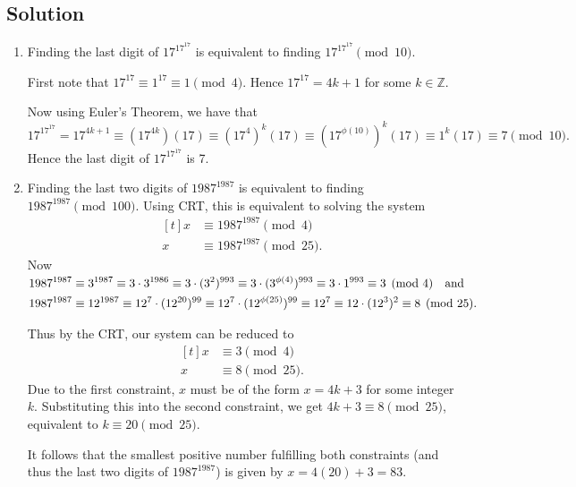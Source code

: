 \documentclass{article}
\begin{document}
\subsection*{Solution}
    \begin{enumerate}
        \item Finding the last digit of $17^{17^{17}}$ is equivalent to finding $17^{17^{17}} \pmod{10}$. 
            
        \vspace{1.5mm}
        First note that $17^{17} \equiv 1^{17} \equiv 1 \pmod 4$. Hence $17^{17} = 4k + 1$ for some $k \in \mathbb{Z}$. 
        
        Now using Euler's Theorem, we have that $$17^{17^{17}} = 17^{4k + 1} \equiv (17^{4k})(17) \equiv (17^{4})^{k}(17) \equiv (17^{\phi(10)})^{k}(17) \equiv 1^{k}(17) \equiv 7 \pmod{10}.$$ Hence the last digit of $17^{17^{17}}$ is 7.
        
        \item Finding the last two digits of $1987^{1987}$ is equivalent to finding $1987^{1987} \pmod{100}$. Using CRT, this is equivalent to solving the system 
        $$\begin{aligned}[t]
            x &\equiv 1987^{1987} \pmod{4} \\
            x &\equiv 1987^{1987} \pmod{25}.
        \end{aligned}$$
        Now 
        $\begin{aligned}[t]
            1987^{1987} &\equiv 3^{1987} \equiv 3 \cdot 3^{1986} \equiv 3 \cdot (3^{2})^{993} \equiv 3 \cdot (3^{\phi(4)})^{993} \equiv 3 \cdot 1^{993} \equiv 3 \pmod{4} \text{\quad and} \\
            1987^{1987} &\equiv 12^{1987} \equiv 12^{7} \cdot (12^{20})^{99} \equiv 12^{7} \cdot (12^{\phi(25)})^{99} \equiv 12^{7} \equiv 12 \cdot (12^{3})^{2} \equiv 8 \pmod{25}.
        \end{aligned}$
        
        \vspace{1.5mm}
        Thus by the CRT, our system can be reduced to
        $$\begin{aligned}[t]
            x &\equiv 3 \pmod{4} \\
            x &\equiv 8 \pmod{25}.
        \end{aligned}$$
        Due to the first constraint, $x$ must be of the form $x = 4k + 3$ for some integer $k$. Substituting this into the second constraint, we get $4k + 3 \equiv 8 \pmod{25}$, equivalent to $k \equiv 20 \pmod{25}$.
        
        \vspace{1.5mm}
        It follows that the smallest positive number fulfilling both constraints (and thus the last two digits of $1987^{1987}$) is given by $x = 4(20) + 3 = 83$.
    \end{enumerate}
\end{document}
